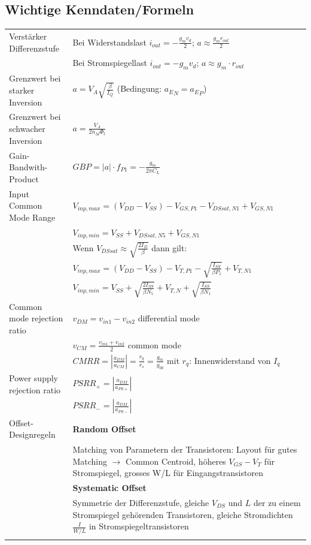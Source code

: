 \subsection{Wichtige Kenndaten/Formeln}
\begin{tabular}{p{}p{}}
	Verstärker Differenzstufe&Bei Widerstandslast $i_{out}=-\frac{g_mv_d}{2}$; $a\approx \frac{g_mr_{out}}{2}$\\
	&Bei Stromspiegellast $i_{out}=-g_mv_d$; $a\approx g_m\cdot r_{out}$\\
	Grenzwert bei starker Inversion& $a=V_A \sqrt{\frac{\beta}{I_Q}}$ (Bedingung: ${a_E}_N = {a_E}_P$)\\
	Grenzwert bei schwacher Inversion& $a=\frac{V_A}{2n_M \Phi_t}$\\
	Gain-Bandwith-Product& $GBP=|a|\cdot f_{P1}=-\frac{g_m}{2\pi C_L}$\\
	Input Common Mode Range&$V_{inp,max}=(V_{DD}-V_{SS})-V_{GS,P1}-V_{DSsat,N1}+V_{GS,N1}$\\
	&$V_{inp,min}=V_{SS}+V_{DSsat,N5}+V_{GS,N1}$\\[2ex]
	&Wenn $V_{DSsat}\approx \sqrt{\frac{2I_D}{\beta}}$ dann gilt:\\
	&$V_{inp,max}=(V_{DD}-V_{SS})-V_{T,P1}-\sqrt{\frac{I_{SS}}{\beta P_1}}+V_{T,N1}$\\
	&$V_{inp,min}=V_{SS}+\sqrt{\frac{2I_{SS}}{\beta N_5}}+V_{T,N}+\sqrt{\frac{I_{SS}}{\beta N_1}}$\\
	Common mode rejection ratio&$v_{DM}=v_{in1}-v_{in2}$ differential mode\\
	&$v_{CM}=\frac{v_{in1}+v_{in2}}{2}$ common mode\\
	&$CMRR=|\frac{a_{DM}}{a_{CM}}|=\frac{r_q}{r_s}=\frac{g_m}{g_{0b}}$ mit $r_q$: Innenwiderstand von $I_q$\\
	Power supply rejection ratio& $PSRR_+=|\frac{a_{DM}}{a_{PS+}}|$\\
	&$PSRR_-=|\frac{a_{DM}}{a_{PS-}}|$\\
	Offset-Designregeln& \textbf{Random Offset}\\
	&Matching von Parametern der Transistoren: Layout für gutes Matching $\rightarrow$ Common Centroid, höheres $V_{GS}-V_T$ für Stromspiegel, grosses W/L für Eingangstransistoren\\
	&\textbf{Systematic Offset}\\
	&Symmetrie der Differenzstufe, gleiche $V_{DS}$ und $L$ der zu einem Stromspiegel gehörenden Transistoren, gleiche Stromdichten $\frac{I}{W/L}$ in Stromspiegeltransistoren\\
	& \textbf{}
\end{tabular}
